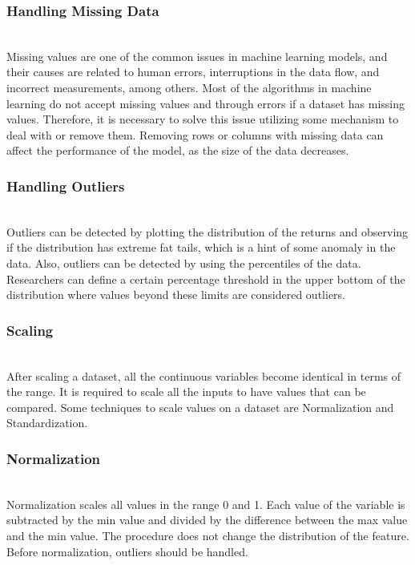 \documentclass[conference]{IEEEtran}
\begin{document}
\subsubsection{Handling Missing Data}\\

Missing values are one of the common issues in machine learning models, and their causes are related to human errors, interruptions in the data flow, and incorrect measurements, among others.
Most of the algorithms in machine learning do not accept missing values and through errors if a dataset has missing values.
Therefore, it is necessary to solve this issue utilizing some mechanism to deal with or remove them.
Removing rows or columns with missing data can affect the performance of the model, as the size of the data decreases.

\subsubsection{Handling Outliers}\\

Outliers can be detected by plotting the distribution of the returns and observing if the distribution has extreme fat tails, which is a hint of some anomaly in the data.
Also, outliers can be detected by using the percentiles of the data.
Researchers can define a certain percentage threshold in the upper bottom of the distribution where values beyond these limits are considered outliers.

\subsubsection{Scaling}\\

After scaling a dataset, all the continuous variables become identical in terms of the range.
It is required to scale all the inputs to have values that can be compared.
Some techniques to scale values on a dataset are Normalization and Standardization.

\subsubsection{Normalization}\\

Normalization scales all values in the range 0 and 1.
Each value of the variable is subtracted by the min value and divided by the difference between the max value and the min value.
The procedure does not change the distribution of the feature.
Before normalization, outliers should be handled.
\end{document}
